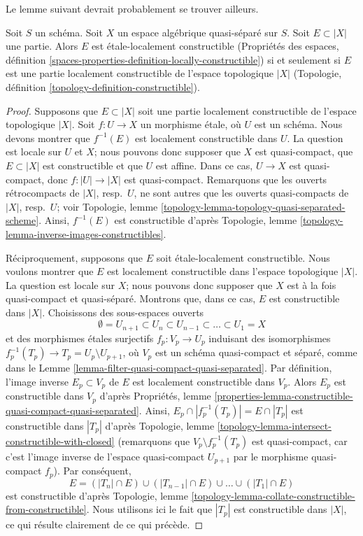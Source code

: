 \noindent
Le lemme suivant devrait probablement se trouver ailleurs.

\begin{lemma}
\label{lemma-locally-constructible}
Soit $S$ un schéma. Soit $X$ un espace algébrique quasi-séparé sur $S$.
Soit $E \subset |X|$ une partie. Alors $E$ est étale-localement constructible
(Propriétés des espaces, définition
\ref{spaces-properties-definition-locally-constructible})
si et seulement si $E$ est une partie localement constructible de
l'espace topologique $|X|$
(Topologie, définition \ref{topology-definition-constructible}).
\end{lemma}

\begin{proof}
Supposons que $E \subset |X|$ soit une partie localement constructible de
l'espace topologique $|X|$. Soit $f : U \to X$ un morphisme étale, où $U$
est un schéma. Nous devons montrer que $f^{-1}(E)$ est localement constructible
dans $U$. La question est locale sur $U$ et $X$; nous pouvons donc supposer
que $X$ est quasi-compact, que $E \subset |X|$ est constructible et que $U$
est affine. Dans ce cas, $U \to X$ est quasi-compact, donc
$f : |U| \to |X|$ est quasi-compact. Remarquons que les ouverts rétrocompacts
de $|X|$, resp.\ $U$, ne sont autres que les ouverts quasi-compacts de
$|X|$, resp.\ $U$; voir
Topologie, lemme \ref{topology-lemma-topology-quasi-separated-scheme}.
Ainsi, $f^{-1}(E)$ est constructible d'après Topologie, lemme
\ref{topology-lemma-inverse-images-constructibles}.

\medskip\noindent
Réciproquement, supposons que $E$ soit étale-localement constructible.
Nous voulons montrer que $E$ est localement constructible dans l'espace
topologique $|X|$. La question est locale sur $X$; nous pouvons donc supposer
que $X$ est à la fois quasi-compact et quasi-séparé. Montrons que, dans ce cas,
$E$ est constructible dans $|X|$. Choisissons des sous-espaces ouverts
$$
\emptyset = U_{n + 1} \subset
U_n \subset U_{n - 1} \subset \ldots \subset U_1 = X
$$
et des morphismes étales surjectifs $f_p : V_p \to U_p$ induisant des
isomorphismes $f_p^{-1}(T_p) \to T_p = U_p \setminus U_{p + 1}$, où $V_p$
est un schéma quasi-compact et séparé, comme dans le
Lemme \ref{lemma-filter-quasi-compact-quasi-separated}.
Par définition, l'image inverse $E_p \subset V_p$ de $E$ est localement
constructible dans $V_p$. Alors $E_p$ est constructible dans $V_p$ d'après
Propriétés, lemme
\ref{properties-lemma-constructible-quasi-compact-quasi-separated}.
Ainsi, $E_p \cap |f_p^{-1}(T_p)| = E \cap |T_p|$ est constructible dans
$|T_p|$ d'après
Topologie, lemme \ref{topology-lemma-intersect-constructible-with-closed}
(remarquons que $V_p \setminus f_p^{-1}(T_p)$ est quasi-compact, car c'est
l'image inverse de l'espace quasi-compact $U_{p + 1}$ par le morphisme
quasi-compact $f_p$). Par conséquent,
$$
E = (|T_n| \cap E) \cup (|T_{n - 1}| \cap E) \cup \ldots \cup
(|T_1| \cap E)
$$
est constructible d'après
Topologie, lemme \ref{topology-lemma-collate-constructible-from-constructible}.
Nous utilisons ici le fait que $|T_p|$ est constructible dans $|X|$, ce qui
résulte clairement de ce qui précède.
\end{proof}





